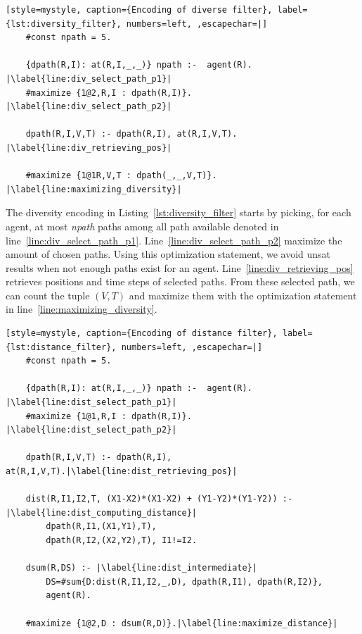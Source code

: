 \begin{minipage}[H]{\linewidth}
\begin{lstlisting}[style=mystyle, caption={Encoding of diverse filter}, label={lst:diversity_filter}, numbers=left, ,escapechar=|]
    #const npath = 5.

    {dpath(R,I): at(R,I,_,_)} npath :-  agent(R). |\label{line:div_select_path_p1}|
    #maximize {1@2,R,I : dpath(R,I)}. |\label{line:div_select_path_p2}|
    
    dpath(R,I,V,T) :- dpath(R,I), at(R,I,V,T). |\label{line:div_retrieving_pos}|
        
    #maximize {1@1R,V,T : dpath(_,_,V,T)}. |\label{line:maximizing_diversity}|
\end{lstlisting}
\end{minipage}

The diversity encoding in Listing~\ref{lst:diversity_filter} starts by picking, for each agent, at most \textit{npath} paths among all path available denoted in line~\ref{line:div_select_path_p1}. Line~\ref{line:div_select_path_p2} maximize the amount of chosen paths. Using this optimization statement, we avoid unsat results when not enough paths exist for an agent. Line~\ref{line:div_retrieving_pos} retrieves positions and time steps of selected paths. From these selected path, we can count the tuple \((V,T)\) and maximize them with the optimization statement in line~\ref{line:maximizing_diversity}.

\begin{minipage}[H]{\linewidth}
\begin{lstlisting}[style=mystyle, caption={Encoding of distance filter}, label={lst:distance_filter}, numbers=left, ,escapechar=|]
    #const npath = 5.

    {dpath(R,I): at(R,I,_,_)} npath :-  agent(R). |\label{line:dist_select_path_p1}|
    #maximize {1@1,R,I : dpath(R,I)}. |\label{line:dist_select_path_p2}|
    
    dpath(R,I,V,T) :- dpath(R,I), at(R,I,V,T).|\label{line:dist_retrieving_pos}|
         
    dist(R,I1,I2,T, (X1-X2)*(X1-X2) + (Y1-Y2)*(Y1-Y2)) :- |\label{line:dist_computing_distance}|
        dpath(R,I1,(X1,Y1),T),  
        dpath(R,I2,(X2,Y2),T), I1!=I2. 

    dsum(R,DS) :- |\label{line:dist_intermediate}|
        DS=#sum{D:dist(R,I1,I2,_,D), dpath(R,I1), dpath(R,I2)}, 
        agent(R).

    #maximize {1@2,D : dsum(R,D)}.|\label{line:maximize_distance}|
\end{lstlisting}

\end{minipage}


